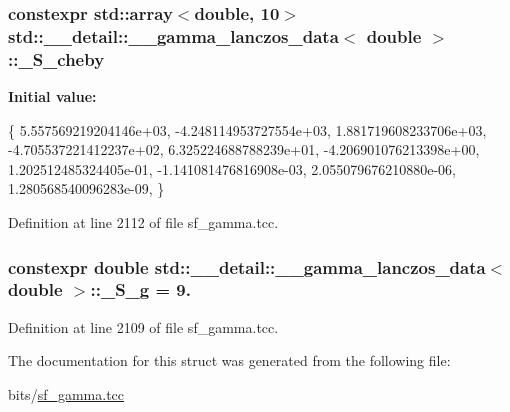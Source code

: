 \subsubsection[{\texorpdfstring{\+\_\+\+S\+\_\+cheby}{_S_cheby}}]{\setlength{\rightskip}{0pt plus 5cm}constexpr std\+::array$<$double, 10$>$ {\bf std\+::\+\_\+\+\_\+detail\+::\+\_\+\+\_\+gamma\+\_\+lanczos\+\_\+data}$<$ double $>$\+::\+\_\+\+S\+\_\+cheby\hspace{0.3cm}{\ttfamily [static]}}\hypertarget{structstd_1_1____detail_1_1____gamma__lanczos__data_3_01double_01_4_a315868c6a789a5e7455f7eb4d8d86115}{}\label{structstd_1_1____detail_1_1____gamma__lanczos__data_3_01double_01_4_a315868c6a789a5e7455f7eb4d8d86115}
{\bfseries Initial value\+:}
\begin{DoxyCode}
\{
     5.557569219204146e+03,
    -4.248114953727554e+03,
     1.881719608233706e+03,
    -4.705537221412237e+02,
     6.325224688788239e+01,
    -4.206901076213398e+00,
     1.202512485324405e-01,
    -1.141081476816908e-03,
     2.055079676210880e-06,
     1.280568540096283e-09,
      \}
\end{DoxyCode}


Definition at line 2112 of file sf\+\_\+gamma.\+tcc.

\subsubsection[{\texorpdfstring{\+\_\+\+S\+\_\+g}{_S_g}}]{\setlength{\rightskip}{0pt plus 5cm}constexpr double {\bf std\+::\+\_\+\+\_\+detail\+::\+\_\+\+\_\+gamma\+\_\+lanczos\+\_\+data}$<$ double $>$\+::\+\_\+\+S\+\_\+g = 9.\hspace{0.3cm}{\ttfamily [static]}}\hypertarget{structstd_1_1____detail_1_1____gamma__lanczos__data_3_01double_01_4_ab7959ed84fcc00db67df8b167165513d}{}\label{structstd_1_1____detail_1_1____gamma__lanczos__data_3_01double_01_4_ab7959ed84fcc00db67df8b167165513d}


Definition at line 2109 of file sf\+\_\+gamma.\+tcc.



The documentation for this struct was generated from the following file\+:\begin{DoxyCompactItemize}
\item 
bits/\hyperlink{sf__gamma_8tcc}{sf\+\_\+gamma.\+tcc}\end{DoxyCompactItemize}
